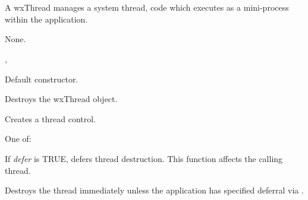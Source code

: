 \section{}\label{wxthread}

A wxThread manages a system thread, code which executes as a mini-process within the application.


None.


, 


\label{wxthreadconstr}


Default constructor.



Destroys the wxThread object.

\label{wxthreadcreate}


Creates a thread control.


One of:

\twocolwidtha{7cm}
\begin{twocollist}\itemsep=0pt
\end{twocollist}

\label{wxthreaddeferdestroy}


If {\it defer} is TRUE, defers thread destruction. This function affects the
calling thread.

\label{wxthreaddestroy}


Destroys the thread immediately unless the application has specified deferral via .


